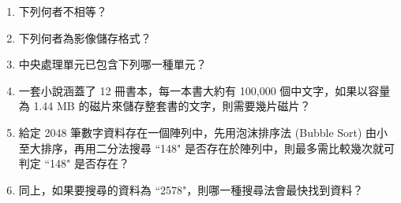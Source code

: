 \documentclass[12pt,a4paper]{report}
\begin{document}
\begin{CJK}{UTF8}{bkai}
\begin{enumerate}
\item 下列何者不相等？
\item 下列何者為影像儲存格式？
\item 中央處理單元已包含下列哪一種單元？
\item 一套小說涵蓋了 12 冊書本，每一本書大約有 100,000 個中文字，如果以容量為 1.44 MB 的磁片來儲存整套書的文字，則需要幾片磁片？
\item 給定 2048 筆數字資料存在一個陣列中，先用泡沫排序法 (Bubble Sort) 由小至大排序，再用二分法搜尋 ``148" 是否存在於陣列中，則最多需比較幾次就可判定 ``148" 是否存在？
\item 同上，如果要搜尋的資料為 ``2578"，則哪一種搜尋法會最快找到資料？
  \begin{optionlist}

\end{optionlist}
\end{enumerate}
\end{CJK}
\end{document}
